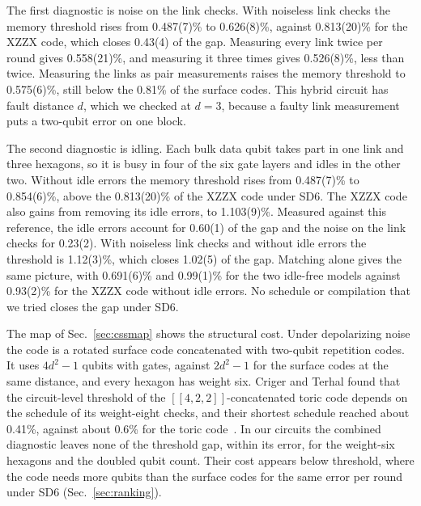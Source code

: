 The first diagnostic is noise on the link checks. With noiseless link checks the \XYZ{} memory threshold rises from 0.487(7)\% to 0.626(8)\%, against 0.813(20)\% for the XZZX code, which closes 0.43(4) of the gap. Measuring every link twice per round gives 0.558(21)\%, and measuring it three times gives 0.526(8)\%, less than twice. Measuring the links as pair measurements raises the memory threshold to 0.575(6)\%, still below the 0.81\% of the surface codes. This hybrid circuit has fault distance $d$, which we checked at $d=3$, because a faulty link measurement puts a two-qubit error on one block.

The second diagnostic is idling. Each bulk data qubit takes part in one link and three hexagons, so it is busy in four of the six gate layers and idles in the other two. Without idle errors the \XYZ{} memory threshold rises from 0.487(7)\% to 0.854(6)\%, above the 0.813(20)\% of the XZZX code under SD6. The XZZX code also gains from removing its idle errors, to 1.103(9)\%. Measured against this reference, the idle errors account for 0.60(1) of the gap and the noise on the link checks for 0.23(2). With noiseless link checks and without idle errors the \XYZ{} threshold is 1.12(3)\%, which closes 1.02(5) of the gap. Matching alone gives the same picture, with 0.691(6)\% and 0.99(1)\% for the two idle-free \XYZ{} models against 0.93(2)\% for the XZZX code without idle errors. No schedule or compilation that we tried closes the gap under SD6.

The map of Sec.~\ref{sec:cssmap} shows the structural cost. Under depolarizing noise the \XYZ{} code is a rotated surface code concatenated with two-qubit repetition codes. It uses $4d^2-1$ qubits with gates, against $2d^2-1$ for the surface codes at the same distance, and every hexagon has weight six. Criger and Terhal found that the circuit-level threshold of the $[[4,2,2]]$-concatenated toric code depends on the schedule of its weight-eight checks, and their shortest schedule reached about 0.41\%, against about 0.6\% for the toric code~\cite{criger2016fourtwotwo}. In our circuits the combined diagnostic leaves none of the threshold gap, within its error, for the weight-six hexagons and the doubled qubit count. Their cost appears below threshold, where the \XYZ{} code needs more qubits than the surface codes for the same error per round under SD6 (Sec.~\ref{sec:ranking}).
